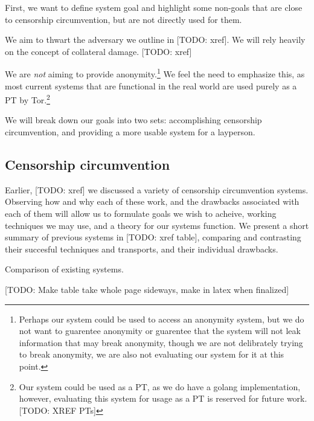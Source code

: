 \documentclass[12pt]{report}
\begin{document}
First, we want to define system goal and highlight some non-goals that are close to censorship circumvention, but are not directly used for them.

We aim to thwart the adversary we outline in [TODO: xref]. We will rely heavily on the concept of collateral damage. [TODO: xref]

We are \emph{not} aiming to provide anonymity.\footnote{Perhaps our system could be used to access an anonymity system, but we do not want to guarentee anonymity or guarentee that the system will not leak information that may break anonymity, though we are not delibrately trying to break anonymity, we are also not evaluating our system for it at this point.} We feel the need to emphasize this, as most current systems that are functional in the real world are used purely as a PT by Tor.\footnote{Our system could be used as a PT, as we do have a golang implementation, however, evaluating this system for usage as a PT is reserved for future work. [TODO: XREF PTs]}

We will break down our goals into two sets: accomplishing censorship circumvention, and providing a more usable system for a layperson.

\subsection{Censorship circumvention}

Earlier, [TODO: xref] we discussed a variety of censorship circumvention systems. Observing how and why each of these work, and the drawbacks associated with each of them will allow us to formulate goals we wish to acheive, working techniques we may use, and a theory for our systems function. We present a short summary of previous systems in [TODO: xref table], comparing and contrasting their succesful techniques and transports, and their individual drawbacks.

\begin{table}
\caption{Comparison of existing systems.}
\begin{center}
[TODO: Make table take whole page sideways, make in latex when finalized]
\end{center}
\end{table}
\end{document}
